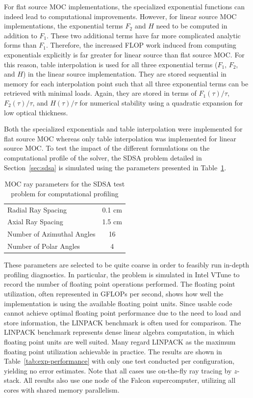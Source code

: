 For flat source \ac{MOC} implementations, the specialized exponential functions can indeed lead to computational improvements. However, for linear source \ac{MOC} implementations, the exponential terms $F_2$ and $H$ need to be computed in addition to $F_1$. These two additional terms have far more complicated analytic forms than $F_1$. Therefore, the increased \ac{FLOP} work induced from computing exponentials explicitly is far greater for linear source than flat source \ac{MOC}. For this reason, table interpolation is used for all three exponential terms ($F_1$, $F_2$, and $H$) in the linear source implementation. They are stored sequential in memory for each interpolation point such that all three exponential terms can be retrieved with minimal loads. Again, they are stored in terms of $F_1(\tau) / \tau$, $F_2(\tau) / \tau$, and $H(\tau) / \tau$ for numerical stability using a quadratic expansion for low optical thickness. 

Both the specialized exponentials and table interpolation were implemented for flat source \ac{MOC} whereas only table interpolation was implemented for linear source \ac{MOC}. To test the impact of the different formulations on the computational profile of the solver, the SDSA problem detailed in Section~\ref{sec:sdsa} is simulated using the parameters presented in Table~\ref{tab:exp-performance-params}. 

\begin{table}[ht]
	\centering
	\caption{MOC ray parameters for the SDSA test problem for computational profiling}
	\medskip
	\begin{tabular}{lc}
		\hline
		Radial Ray Spacing & 0.1 cm \\
		Axial Ray Spacing & 1.5 cm \\
		Number of Azimuthal Angles & 16 \\
		Number of Polar Angles & 4 \\
		\hline
	\end{tabular}
	\label{tab:exp-performance-params}
\end{table}

These parameters are selected to be quite coarse in order to feasibly run in-depth profiling diagnostics. In particular, the problem is simulated in Intel VTune to record the number of floating point operations performed. The floating point utilization, often represented in G\acp{FLOP} per second, shows how well the implementation is using the available floating point units. Since usable code cannot achieve optimal floating point performance due to the need to load and store information, the LINPACK benchmark is often used for comparison. The LINPACK benchmark represents dense linear algebra computation, in which floating point units are well suited. Many regard LINPACK as the maximum floating point utilization achievable in practice. The results are shown in Table~\ref{tab:exp-performance} with only one test conducted per configuration, yielding no error estimates. Note that all cases use on-the-fly ray tracing by $z$-stack. All results also use one node of the Falcon supercomputer, utilizing all cores with shared memory parallelism.


